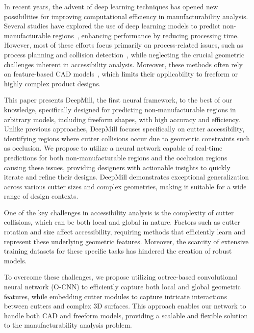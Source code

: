 In recent years, the advent of deep learning techniques has opened new possibilities for improving computational efficiency in manufacturability analysis.
Several studies have explored the use of deep learning models to predict non-manufacturable regions~\cite{kerbrat2011new,chen2020manufacturability,ghadai2018learning}, enhancing performance by reducing processing time. 
However, most of these efforts focus primarily on process-related issues, such as process planning and collision detection~\cite{chen2020manufacturability}, while neglecting the crucial geometric challenges inherent in accessibility analysis.
Moreover, these methods often rely on feature-based CAD models~\cite{yan2023automated,balu2020orthogonal}, which limits their applicability to freeform or highly complex product designs.

This paper presents DeepMill, the first neural framework, to the best of our knowledge, specifically designed for predicting non-manufacturable regions in arbitrary models, including freeform shapes, with high accuracy and efficiency. Unlike previous approaches, DeepMill focuses specifically on cutter accessibility, identifying regions where cutter collisions occur due to geometric constraints such as occlusion. 
We propose to utilize a neural network capable of real-time predictions for both non-manufacturable regions and the occlusion regions causing these issues, providing designers with actionable insights to quickly iterate and refine their designs. 
DeepMill demonstrates exceptional generalization across various cutter sizes and complex geometries, making it suitable for a wide range of design contexts.


One of the key challenges in accessibility analysis is the complexity of cutter collisions, which can be both local and global in nature. Factors such as cutter rotation and size affect accessibility, requiring methods that efficiently learn and represent these underlying geometric features. 
Moreover, the scarcity of extensive training datasets for these specific tasks has hindered the creation of robust models.


%
To overcome these challenges, we propose utilizing octree-based convolutional neural network (O-CNN) to efficiently capture both local and global geometric features, while embedding cutter modules to capture intricate interactions between cutters and complex 3D surfaces.
This approach enables our network to handle both CAD and freeform models, providing a scalable and flexible solution to the manufacturability analysis problem.

